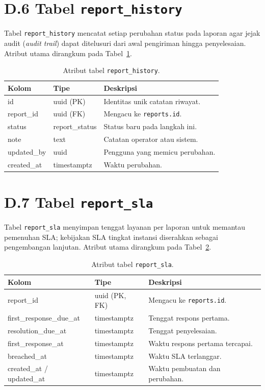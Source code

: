 \section*{D.6 Tabel \texttt{report\_history}}

Tabel \texttt{report\_history} mencatat setiap perubahan status pada laporan agar jejak audit (\textit{audit trail}) dapat ditelusuri dari awal pengiriman hingga penyelesaian. Atribut utama dirangkum pada Tabel~\ref{tab:report-history}.

\begin{table}[htbp]
\centering
\caption{Atribut tabel \texttt{report\_history}.}
\label{tab:report-history}
\small
\begin{tabular}{p{3.4cm} p{2.6cm} p{6.5cm}}
\toprule
\textbf{Kolom} & \textbf{Tipe} & \textbf{Deskripsi} \\
\midrule
id & uuid (PK) & Identitas unik catatan riwayat. \\
report\_id & uuid (FK) & Mengacu ke \texttt{reports.id}. \\
status & report\_status & Status baru pada langkah ini. \\
note & text & Catatan operator atau sistem. \\
updated\_by & uuid & Pengguna yang memicu perubahan. \\
created\_at & timestamptz & Waktu perubahan. \\
\bottomrule
\end{tabular}
\end{table}

\section*{D.7 Tabel \texttt{report\_sla}}

Tabel \texttt{report\_sla} menyimpan tenggat layanan per laporan untuk memantau pemenuhan SLA; kebijakan SLA tingkat instansi diserahkan sebagai pengembangan lanjutan. Atribut utama dirangkum pada Tabel~\ref{tab:report-sla}.

\begin{table}[htbp]
\centering
\caption{Atribut tabel \texttt{report\_sla}.}
\label{tab:report-sla}
\small
\begin{tabular}{p{3.8cm} p{2.4cm} p{6.3cm}}
\toprule
\textbf{Kolom} & \textbf{Tipe} & \textbf{Deskripsi} \\
\midrule
report\_id & uuid (PK, FK) & Mengacu ke \texttt{reports.id}. \\
first\_response\_due\_at & timestamptz & Tenggat respons pertama. \\
resolution\_due\_at & timestamptz & Tenggat penyelesaian. \\
first\_response\_at & timestamptz & Waktu respons pertama tercapai. \\
breached\_at & timestamptz & Waktu SLA terlanggar. \\
created\_at / updated\_at & timestamptz & Waktu pembuatan dan perubahan. \\
\bottomrule
\end{tabular}
\end{table}

